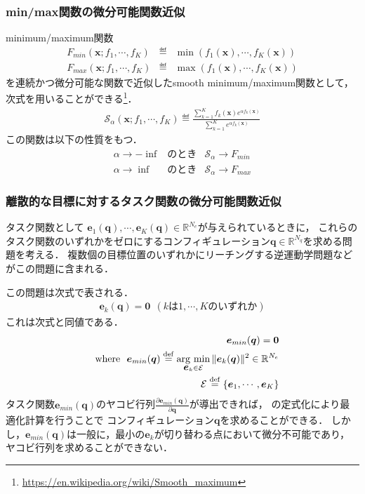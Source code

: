 \subsubsection*{min/max関数の微分可能関数近似}

minimum/maximum関数
\begin{eqnarray}
  F_{min}(\bm{x}; f_1, \cdots, f_K) &\eqdef& \min (f_1(\bm{x}), \cdots, f_K(\bm{x})) \label{eq:original-min} \\
  F_{max}(\bm{x}; f_1, \cdots, f_K) &\eqdef& \max (f_1(\bm{x}), \cdots, f_K(\bm{x})) \label{eq:original-max}
\end{eqnarray}
を連続かつ微分可能な関数で近似したsmooth minimum/maximum関数として，次式を用いることができる\footnote{\url{https://en.wikipedia.org/wiki/Smooth_maximum}}．
\begin{eqnarray}
  \mathcal{S}_{\alpha}(\bm{x}; f_1, \cdots, f_K) \eqdef \frac{\sum_{k=1}^{K} f_k(\bm{x}) e^{\alpha f_k(\bm{x})}}{\sum_{k=1}^{K} e^{\alpha f_k(\bm{x})}} \label{eq:smooth-max}
\end{eqnarray}
この関数は以下の性質をもつ．
\begin{eqnarray}
  \alpha \to - \inf &のとき& \mathcal{S}_{\alpha} \to F_{min} \\
  \alpha \to \inf &のとき& \mathcal{S}_{\alpha} \to F_{max}
\end{eqnarray}

\subsubsection*{離散的な目標に対するタスク関数の微分可能関数近似}

タスク関数として
$\bm{e}_1(\bm{q}), \cdots, \bm{e}_K(\bm{q}) \in \mathbb{R}^{N_e}$が与えられているときに，
これらのタスク関数のいずれかをゼロにするコンフィギュレーション$\bm{q} \in \mathbb{R}^{N_q}$を求める問題を考える．
複数個の目標位置のいずれかにリーチングする逆運動学問題などがこの問題に含まれる．

この問題は次式で表される．
\begin{eqnarray}
  \bm{e}_k(\bm{q}) = \bm{0} \ \ (kは1,\cdots,Kのいずれか)
\end{eqnarray}
これは次式と同値である．
\begin{eqnarray}
  &&\mbox{\boldmath{$e$}}_{min}(\mbox{\boldmath{$q$}}) = \mbox{\boldmath{$0$}} \\
  &&{\rm where \ \ } \mbox{\boldmath{$e$}}_{min}(\mbox{\boldmath{$q$}}) \stackrel{\mathrm{def}}{=} \mathop{\rm arg~min}\limits_{\mbox{\boldmath{$e$}}_k \in \mathcal{E}} \| \mbox{\boldmath{$e$}}_k(\mbox{\boldmath{$q$}}) \|^2 \in \mathbb{R}^{N_e} \\
  &&\phantom{\rm where \ \ }\mathcal{E} \stackrel{\mathrm{def}}{=} \{ \mbox{\boldmath{$e$}}_1,\cdots,\mbox{\boldmath{$e$}}_K \}
\end{eqnarray}
タスク関数$\bm{e}_{min}(\bm{q})$のヤコビ行列$\frac{\partial \bm{e}_{min}(\bm{q})}{\partial \bm{q}}$が導出できれば，
の定式化により最適化計算を行うことで
コンフィギュレーション$\bm{q}$を求めることができる．
しかし，$\bm{e}_{min}(\bm{q})$は一般に，最小の$\bm{e}_k$が切り替わる点において微分不可能であり，
ヤコビ行列を求めることができない．

